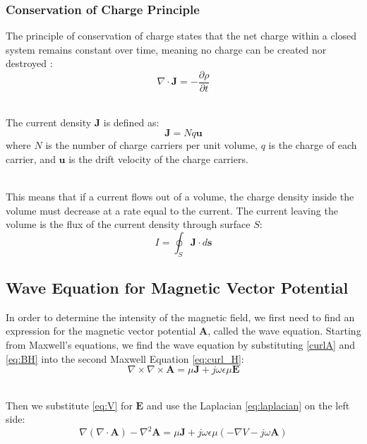 \documentclass[main]{subfiles}
\begin{document}
\subsubsection{Conservation of Charge Principle}
The principle of conservation of charge states 
that the net charge within a closed system remains 
constant over time, meaning no charge can be 
created nor destroyed \cite{book-magnetism}:
\begin{equation}
    \nabla \cdot \mathbf{J} = -\frac{\partial \rho}
 {\partial t}
\end{equation}

\noindent\\
The current density \(\mathbf{J}\) is defined as:
\begin{equation}
 \mathbf{J} = N q \mathbf{u}
\end{equation}
where \(N\) is the number of charge carriers per 
unit volume, \(q\) is the charge of each carrier, 
and \(\mathbf{u}\) is the drift velocity of the 
charge carriers.

\noindent\\
This means that if a current flows out of a volume, 
the charge density inside the volume must decrease 
at a rate equal to the current. The current leaving 
the volume is the flux of the current density 
through surface \(S\):
\begin{equation}
 I = \oint_S \mathbf{J} \cdot d\mathbf{s}
    \label{eq:defI}
\end{equation}

\subsection{Wave Equation for Magnetic Vector Potential}
In order to determine the intensity of the magnetic 
field, we first need to find an expression for the 
magnetic vector potential \(\mathbf{A}\), called the 
wave equation. Starting from Maxwell's equations, 
we find the wave equation by substituting \ref{curlA} 
and \ref{eq:BH} into the second Maxwell Equation 
\eqref{eq:curl_H}:
\[
    \nabla \times \nabla \times \mathbf{A} = 
    \mu \mathbf{J} + j\omega\epsilon \mu \mathbf{E}
\]

\noindent\\
Then we substitute \ref{eq:V} for $\mathbf{E}$ and 
use the Laplacian \eqref{eq:laplacian} on the left side:
\[
    \nabla (\nabla \cdot \mathbf{A}) - \nabla^2 
 \mathbf{A} = \mu \mathbf{J} + j\omega \epsilon 
    \mu \left(-\nabla V - j \omega \mathbf{A}\right)
\]
\end{document}
